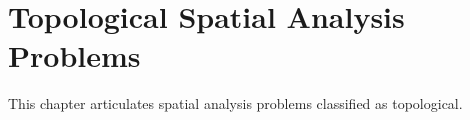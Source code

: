 \chapter{Topological Spatial Analysis Problems}

This chapter articulates spatial analysis problems classified as topological.